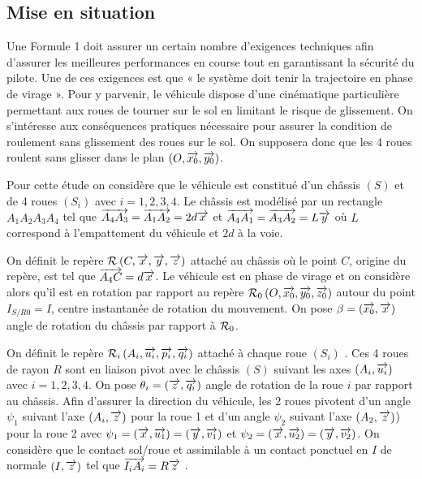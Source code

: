 \documentclass[10pt,fleqn]{article} %
\begin{document}
\ifprof
\else
\begin{multicols}{2}
\fi


\subsection*{Mise en situation}
Une Formule 1 doit assurer un certain nombre d’exigences techniques afin d’assurer les meilleures performances en course tout en garantissant la sécurité du pilote. Une de ces exigences est que « le système doit tenir la trajectoire en phase de virage ». Pour y parvenir, le véhicule dispose d'une cinématique particulière permettant aux roues de tourner sur le sol en limitant le risque de glissement. On s'intéresse aux conséquences pratiques nécessaire pour assurer la condition de roulement sans glissement des roues sur le sol. On supposera donc que les 4 roues roulent sans glisser dans le plan
$\left(O,\overrightarrow{x_0},\overrightarrow{y_0}\right)$. 


Pour cette étude on considère que le véhicule est constitué d’un châssis \textbf{$(S)$} et de 4 roues \textbf{$(S_i)$}
 avec $i=1,2,3,4$.  Le châssis est modélisé par un rectangle $A_1A_2A_3A_4$ tel que 
 $\overrightarrow{A_4 A_3}=\overrightarrow{A_1 A_2}=2d\overrightarrow{x}$ et $\overrightarrow{A_4 A_1}=\overrightarrow{A_3 A_2}=L\overrightarrow{y}$  où $L$ correspond à l’empattement du véhicule et $2d$ à la voie. 


On définit le repère $\mathcal{R}_{}\left({C},\overrightarrow{x},\overrightarrow{y},\overrightarrow{z}\right)$ attaché au châssis où le point $C$, origine du repère, est tel que 
$\overrightarrow{A_4 C}= d\overrightarrow{x}$. Le véhicule est en phase de virage et on considère alors qu’il est en rotation par rapport au
repère $\mathcal{R}_{0}\left({O},\overrightarrow{x_0},\overrightarrow{y_0},\overrightarrow{z_0}\right)$ autour du point $I_{S/R0} = I$, centre instantanée de rotation du mouvement. On pose $\beta=\left(\overrightarrow{x_0},\overrightarrow{x}\right)$  angle de rotation du châssis par rapport à $\mathcal{R}_{0}$. 

On définit le repère $\mathcal{R}_{i}\left({A_i},\overrightarrow{u_i},\overrightarrow{p_i},\overrightarrow{q_i}\right)$ attaché à chaque roue $(S_i)$ . Ces 4 roues de rayon $R$ sont en
liaison pivot avec le châssis $(S)$ suivant les axes $\left(A_i,\overrightarrow{u_i}\right)$ avec 
$i=1,2,3,4$. On pose $\theta_i=\left(\overrightarrow{z},\overrightarrow{q_i}\right)$ angle de rotation de la roue $i$ par rapport au châssis. 
Afin d’assurer la direction du véhicule, les 2 roues pivotent d’un angle $\psi_1$ suivant l’axe $\left(A_i,\overrightarrow{z}\right)$ pour la roue 1 et d’un angle $\psi_2$ suivant l’axe $\left(A_2,\overrightarrow{z}\right)$) pour la roue 2 avec $\psi_1=\left(\overrightarrow{x},\overrightarrow{u_1}\right)=\left(\overrightarrow{y},\overrightarrow{v_1}\right)$ et $\psi_2=\left(\overrightarrow{x},\overrightarrow{u_2}\right)=\left(\overrightarrow{y},\overrightarrow{v_2}\right)$. 
On considère que le contact sol/roue et assimilable à un contact ponctuel en $I$ de normale $\left(I,\overrightarrow{z}\right)$ tel que $\overrightarrow{I_i A_i}=R\overrightarrow{z}$ .  




\end{multicols}
\end{document}
